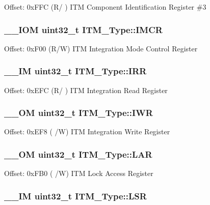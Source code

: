 Offset\-: 0x\-F\-F\-C (R/ ) I\-T\-M Component Identification Register \#3 \hypertarget{struct_i_t_m___type_ae2ce4d3a54df2fd11a197ccac4406cd0}{
\subsubsection[{I\-M\-C\-R}]{\setlength{\rightskip}{0pt plus 5cm}\-\_\-\-\_\-\-I\-O\-M uint32\-\_\-t I\-T\-M\-\_\-\-Type\-::\-I\-M\-C\-R}}\label{struct_i_t_m___type_ae2ce4d3a54df2fd11a197ccac4406cd0}
Offset\-: 0x\-F00 (R/\-W) I\-T\-M Integration Mode Control Register \hypertarget{struct_i_t_m___type_a66eb82a070953f09909f39b8e516fb91}{
\subsubsection[{I\-R\-R}]{\setlength{\rightskip}{0pt plus 5cm}\-\_\-\-\_\-\-I\-M uint32\-\_\-t I\-T\-M\-\_\-\-Type\-::\-I\-R\-R}}\label{struct_i_t_m___type_a66eb82a070953f09909f39b8e516fb91}
Offset\-: 0x\-E\-F\-C (R/ ) I\-T\-M Integration Read Register \hypertarget{struct_i_t_m___type_aa9da04891e48d1a2f054de186e9c4c94}{
\subsubsection[{I\-W\-R}]{\setlength{\rightskip}{0pt plus 5cm}\-\_\-\-\_\-\-O\-M uint32\-\_\-t I\-T\-M\-\_\-\-Type\-::\-I\-W\-R}}\label{struct_i_t_m___type_aa9da04891e48d1a2f054de186e9c4c94}
Offset\-: 0x\-E\-F8 ( /\-W) I\-T\-M Integration Write Register \hypertarget{struct_i_t_m___type_a7f9c2a2113a11c7f3e98915f95b669d5}{
\subsubsection[{L\-A\-R}]{\setlength{\rightskip}{0pt plus 5cm}\-\_\-\-\_\-\-O\-M uint32\-\_\-t I\-T\-M\-\_\-\-Type\-::\-L\-A\-R}}\label{struct_i_t_m___type_a7f9c2a2113a11c7f3e98915f95b669d5}
Offset\-: 0x\-F\-B0 ( /\-W) I\-T\-M Lock Access Register \hypertarget{struct_i_t_m___type_a3861c67933a24dd6632288c4ed0b80c8}{
\subsubsection[{L\-S\-R}]{\setlength{\rightskip}{0pt plus 5cm}\-\_\-\-\_\-\-I\-M uint32\-\_\-t I\-T\-M\-\_\-\-Type\-::\-L\-S\-R}}\label{struct_i_t_m___type_a3861c67933a24dd6632288c4ed0b80c8}
